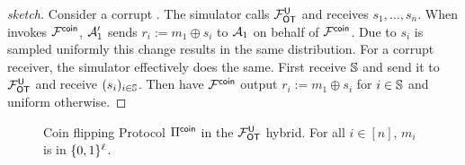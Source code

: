 \else
\begin{proof}[sketch]
	Consider a corrupt \send. The simulator calls $\mathcal{F}_{\mathsf{OT}}^{\mathsf{U}}$ and receives $s_1,...,s_n$. When \send invokes $\mathcal{F}^{\mathsf{coin}}$, $\mathcal{A}_1'$ sends $r_i:=m_1\oplus s_i$ to $\mathcal{A}_1$ on behalf of $\mathcal{F}^{\mathsf{coin}}$. Due to $s_i$ is sampled uniformly this change results in the same distribution. 
	For a corrupt receiver, the simulator effectively does the same. First receive $\mathsf{\mathbb S}$ and send it to $\mathcal{F}_{\mathsf{OT}}^{\mathsf{U}}$ and receive $(s_i)_{i\in\mathsf{\mathbb S}}$. Then have  $\mathcal{F}^{\mathsf{coin}}$ output $r_i:=m_1\oplus s_i$ for $i\in\mathsf{\mathbb S}$ and uniform otherwise.
\pe
\end{proof}
\fi























\begin{figure}[t]
\centering
{}
	\caption{Coin flipping Protocol $\Pi^{\mathsf{coin}}$ in the $\mathcal{F}_{\mathsf{OT}}^{\mathsf{U}}$ hybrid. For all $i\in[n]$, $m_i$ is in $\{0,1\}^\ell$.}
	\label{fig:coinFlip}
\end{figure}


